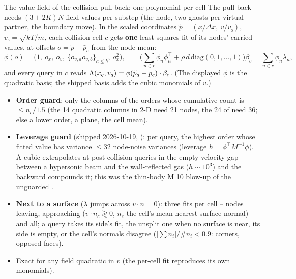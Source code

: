 \begin{frame}{The value field of the collision pull-back: one polynomial per cell}
The pull-back needs $(3+2K)N$ field values per substep (the node, two ghosts per virtual partner, the
boundary move).  In the scaled coordinates $\tilde p = (x/\Delta x,\ v/v_{\mathrm{s}})$, $v_{\mathrm{s}} = \sqrt{kT/m}$,
each collision cell $c$ gets \textbf{one} least-squares fit of its nodes' carried values, at offsets
$o = \tilde p - \bar p_c$ from the node mean:
\[
\phi(o) = \big(1,\ o_x,\ o_v,\ \{o_{v,a}o_{v,b}\}_{a\le b},\ o_x^{2}\big),\qquad
\Big(\sum_{n\in c}\phi_n\phi_n^\top + \rho\,\bar d\,\mathrm{diag}(0,1,\dots,1)\Big)\beta_c = \sum_{n\in c}\phi_n\lambda_n ,
\]
and every query in $c$ reads $\Lambda(x_q, v_q) = \phi(\tilde p_q - \bar p_c)\cdot\beta_c$.  (The
displayed $\phi$ is the quadratic basis; the shipped basis  adds the cubic monomials of $v$.)
\begin{itemize}
\item \textbf{Order guard}: only the columns of the orders whose cumulative count is $\le n_c/1.5$
  (the 14 quadratic columns in 2-D need 21 nodes, the 24 of  need 36; else a lower order, a plane, the cell mean).
\item \textbf{Leverage guard} (shipped 2026-10-19, ): per query, the highest order whose fitted value has variance
  $\le 32$ node-noise variances (leverage $h = \phi^\top M^{-1}\phi$).  A cubic extrapolates at post-collision queries in the empty
  velocity gap between a hypersonic beam and the wall-reflected gas ($h\sim10^3$) and the backward compounds it; this was the
  thin-body M 10 blow-up of the unguarded .
\item \textbf{Next to a surface} ($\lambda$ jumps across $v\cdot n = 0$): three fits per cell -- nodes leaving,
  approaching ($v\cdot n_c \gtrless 0$, $n_c$ the cell's mean nearest-surface normal) and all; a query takes
  its side's fit, the unsplit one when no surface is near, its side is empty, or the cell's normals
  disagree ($|\sum n_i|/\#n_i < 0.9$: corners, opposed faces).
\item Exact for any field quadratic in $v$ (the per-cell fit reproduces its own monomials).
\end{itemize}
\end{frame}

